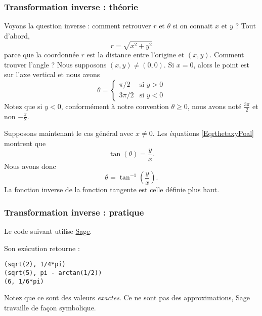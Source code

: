 \subsubsection{Transformation inverse : théorie}

Voyons la question inverse : comment retrouver $r$ et $\theta$ si on connait $x$ et $y$ ? Tout d'abord,
\begin{equation}
	r=\sqrt{x^2+y^2}
\end{equation}
parce que la coordonnée $r$ est la distance entre l'origine et $(x,y)$. Comment trouver l'angle ? Nous supposons $(x,y)\neq (0,0)$. Si $x=0$, alors le point est sur l'axe vertical et nous avons
\begin{equation}
	\theta=\begin{cases}
		\pi/2	&	\text{si }y>0\\
		3\pi/2	&	 \text{si }y<0
	\end{cases}
\end{equation}
Notez que si $y<0$, conformément à notre convention $\theta\geq 0$, nous avons noté $\frac{ 3\pi }{2}$ et non $-\frac{ \pi }{ 2 }$.

Supposons maintenant le cas général avec $x\neq 0$. Les équations \eqref{EqrthetaxyPoal} montrent que
\begin{equation}
	\tan(\theta)=\frac{ y }{ x }.
\end{equation}
Nous avons donc
\begin{equation}
	\theta=\tan^{-1}\left( \frac{ y }{ x } \right).
\end{equation}
La fonction inverse de la fonction tangente est celle définie plus haut.

\subsubsection{Transformation inverse : pratique}

Le code suivant utilise \href{http://www.sagemath.org}{Sage}.



Son exécution retourne :
\begin{verbatim}
(sqrt(2), 1/4*pi)
(sqrt(5), pi - arctan(1/2))
(6, 1/6*pi)
\end{verbatim}
Notez que ce sont des valeurs \emph{exactes}. Ce ne sont pas des approximations, Sage travaille de façon symbolique.

